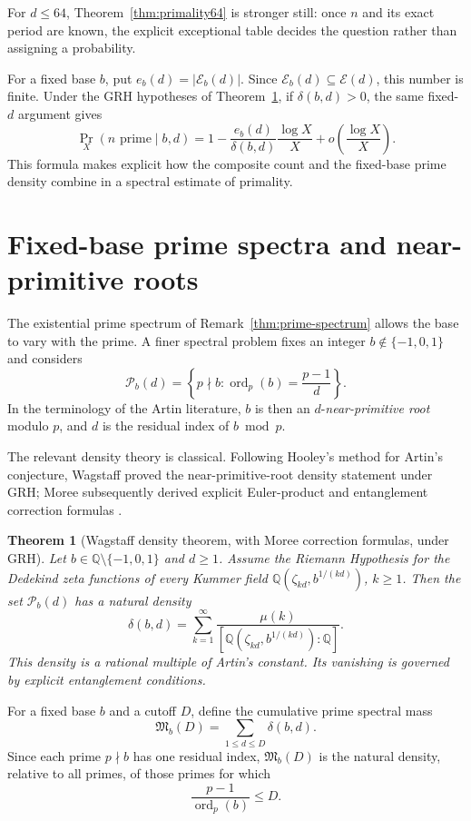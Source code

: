 \documentclass[11pt]{article}
\newtheorem{theorem}{Theorem}[section]
\newcommand{\ord}{\operatorname{ord}}
\newcommand{\Eset}{\mathcal E}
\newcommand{\Pset}{\mathcal P}
\begin{document}
For $d\le64$, Theorem~\ref{thm:primality64} is stronger still: once $n$ and
its exact period are known, the explicit exceptional table decides the
question rather than assigning a probability.

For a fixed base $b$, put $e_b(d)=|\Eset_b(d)|$.  Since
$\Eset_b(d)\subseteq\Eset(d)$, this number is finite.  Under the GRH
hypotheses of Theorem~\ref{thm:moree-density}, if $\delta(b,d)>0$, the same
fixed-$d$ argument gives
\[
\Pr_X(n\text{ prime}\mid b,d)
=
1-\frac{e_b(d)}{\delta(b,d)}\frac{\log X}{X}
+o\!\left(\frac{\log X}{X}\right).
\]
This formula makes explicit how the composite count and the fixed-base prime
density combine in a spectral estimate of primality.

\section{Fixed-base prime spectra and near-primitive roots}
\label{sec:fixed-base}

The existential prime spectrum of Remark~\ref{thm:prime-spectrum} allows the
base to vary with the prime.  A finer spectral problem fixes an integer
$b\notin\{-1,0,1\}$ and considers
\[
\Pset_b(d)
=
\left\{
p\nmid b:
\ord_p(b)=\frac{p-1}{d}
\right\}.
\]
In the terminology of the Artin literature, $b$ is then an
$d$-\emph{near-primitive root} modulo $p$, and $d$ is the residual index of
$b\bmod p$.

The relevant density theory is classical.  Following Hooley's method for
Artin's conjecture, Wagstaff proved the near-primitive-root density statement
under GRH; Moree subsequently derived explicit Euler-product and entanglement
correction formulas \cite{Wagstaff1982,Moree2000,Moree2013}.

\begin{theorem}[Wagstaff density theorem, with Moree correction formulas, under GRH]
\label{thm:moree-density}
Let $b\in\mathbb Q\setminus\{-1,0,1\}$ and $d\ge1$.  Assume the Riemann Hypothesis for the Dedekind zeta functions of every Kummer field
$\mathbb Q(\zeta_{kd},b^{1/(kd)})$, $k\ge1$.  Then the set
$\Pset_b(d)$ has a natural density
\[
\delta(b,d)
=
\sum_{k=1}^{\infty}
\frac{\mu(k)}
{[\mathbb Q(\zeta_{kd},b^{1/(kd)}):\mathbb Q]}.
\tag{A1}\label{eq:moree-series}
\]
This density is a rational multiple of Artin's constant.  Its vanishing is
governed by explicit entanglement conditions.
\end{theorem}

For a fixed base $b$ and a cutoff $D$, define the cumulative prime spectral
mass
\[
\mathfrak M_b(D)=\sum_{1\le d\le D}\delta(b,d).
\]
Since each prime $p\nmid b$ has one residual index, $\mathfrak M_b(D)$ is the
natural density, relative to all primes, of those primes for which
\[
\frac{p-1}{\ord_p(b)}\le D.
\]
\end{document}
